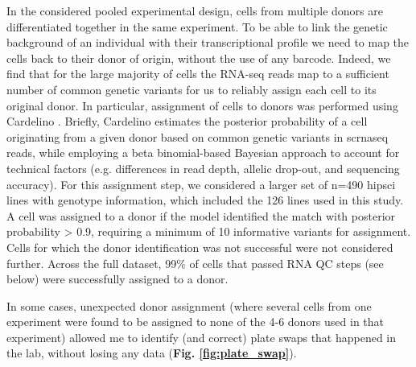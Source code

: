 In the considered pooled experimental design, cells from multiple donors are differentiated together in the same experiment. 
To be able to link the genetic background of an individual with their transcriptional profile we need to map the cells back to their donor of origin, without the use of any barcode.
Indeed, we find that for the large majority of cells the RNA-seq reads map to a sufficient number of common genetic variants for us to reliably assign each cell to its original donor.
In particular, assignment of cells to donors was performed using Cardelino \cite{mccarthy2020cardelino}. 
Briefly, Cardelino estimates the posterior probability of a cell originating from a given donor based on common genetic variants in \gls{scrnaseq} reads, while employing a beta binomial-based Bayesian approach to account for technical factors (e.g. differences in read depth, allelic drop-out, and sequencing accuracy). 
For this assignment step, we considered a larger set of n=490 \gls{hipsci} lines with genotype information, which included the 126 lines used in this study. 
A cell was assigned to a donor if the model identified the match with posterior probability > 0.9, requiring a minimum of 10 informative variants for assignment. 
Cells for which the donor identification was not successful were not considered further.
Across the full dataset, 99\% of cells that passed RNA QC steps (see below) were successfully assigned to a donor.

In some cases, unexpected donor assignment (where several cells from one experiment were found to be assigned to none of the 4-6 donors used in that experiment) allowed me to identify (and correct) plate swaps that happened in the lab, without losing any data (\textbf{Fig. \ref{fig:plate_swap}}).

